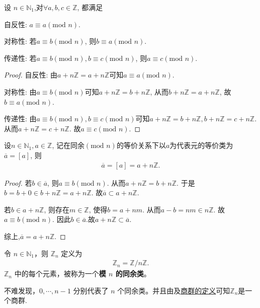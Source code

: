 \documentclass[../../main.tex]{subfiles}
\begin{document}
\begin{proposition}
设 $n\in \mathbb{N}_1$,对$\forall a, b, c \in \mathbb{Z}$, 都满足

自反性: $a \equiv a (\mathrm{mod}\,\,n)$.

对称性: 若$a \equiv b (\mathrm{mod}\,\,n)$, 则$b \equiv a (\mathrm{mod}\,\,n)$.

传递性: 若$a \equiv b (\mathrm{mod}\,\,n), b \equiv c (\mathrm{mod}\,\,n)$, 则$a \equiv c (\mathrm{mod}\,\,n)$.
\end{proposition}
\begin{proof}
自反性: 由$a + n\mathbb{Z} = a + n\mathbb{Z}$可知$a \equiv a (\mathrm{mod}\,\,n)$.

对称性: 由$a \equiv b (\mathrm{mod}\,\,n)$可知$a + n\mathbb{Z} = b + n\mathbb{Z}$, 从而$b + n\mathbb{Z} = a + n\mathbb{Z}$, 故$b \equiv a (\mathrm{mod}\,\,n)$.

传递性: 由$a \equiv b (\mathrm{mod}\,\,n), b \equiv c (\mathrm{mod}\,\,n)$可知$a + n\mathbb{Z} = b + n\mathbb{Z}, b + n\mathbb{Z} = c + n\mathbb{Z}$. 从而$a + n\mathbb{Z} = c + n\mathbb{Z}$. 故$a \equiv c (\mathrm{mod}\,\,n)$. 

\end{proof}

\begin{proposition}\label{proposition:模n同余等价类就是nZ}
设$n \in \mathbb{N}_1, a \in \mathbb{Z}$, 记在同余$(\mathrm{mod}\,\,n)$的等价关系下以$a$为代表元的等价类为$\overline{a} = [a]$, 则
\begin{align*}
\overline{a} = [a] = a + n\mathbb{Z}.
\end{align*}
\end{proposition}
\begin{proof}
若$b \in \overline{a}$, 则$a \equiv b (\mathrm{mod}\,\,n)$. 从而$a + n\mathbb{Z} = b + n\mathbb{Z}$. 于是$b = b + 0 \in b + n\mathbb{Z} = a + n\mathbb{Z}$. 故$\overline{a} \subset a + n\mathbb{Z}$.

若$b \in a + n\mathbb{Z}$, 则存在$m \in \mathbb{Z}$, 使得$b = a + nm$. 从而$a - b = nm \in n\mathbb{Z}$. 故$a \equiv b (\mathrm{mod}\,\,n)$. 因此$b \in \overline{a}$.故$ a + n\mathbb{Z}\subset \overline{a}$.

综上,$\overline{a} = a + n\mathbb{Z}$.

\end{proof}

\begin{definition}[模 $n$ 的同余类]
令 $n\in \mathbb{N}_1$，则 $\mathbb{Z}_n$ 定义为
\begin{align*}
\mathbb{Z}_n=\mathbb{Z}/n\mathbb{Z}.
\end{align*}
$\mathbb{Z}_n$ 中的每个元素，被称为一个\textbf{模 $n$ 的同余类}。
\end{definition}
\begin{note}
不难发现，$0,\cdots,n - 1$ 分别代表了 $n$ 个同余类。并且由及\hyperref[proposition:商群]{商群的定义}可知$\mathbb{Z}_n$是一个商群.
\end{note}
\end{document}
